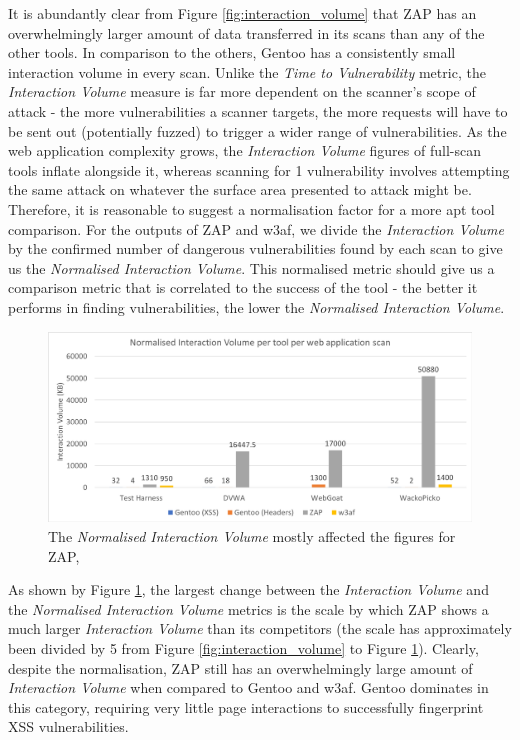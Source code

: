 It is abundantly clear from Figure \ref{fig:interaction_volume} that ZAP has an overwhelmingly larger amount of data transferred in its scans than any of the other tools. In comparison to the others, Gentoo has a consistently small interaction volume in every scan. Unlike the \textit{Time to Vulnerability} metric, the \textit{Interaction Volume} measure is far more dependent on the scanner's scope of attack - the more vulnerabilities a scanner targets, the more requests will have to be sent out (potentially fuzzed) to trigger a wider range of vulnerabilities. As the web application complexity grows, the \textit{Interaction Volume} figures of full-scan tools inflate alongside it, whereas scanning for 1 vulnerability involves attempting the same attack on whatever the surface area presented to attack might be. Therefore, it is reasonable to suggest a normalisation factor for a more apt tool comparison. For the outputs of ZAP and w3af, we divide the \textit{Interaction Volume} by the confirmed number of dangerous vulnerabilities found by each scan to give us the \textit{Normalised Interaction Volume}. This normalised metric should give us a comparison metric that is correlated to the success of the tool - the better it performs in finding vulnerabilities, the lower the \textit{Normalised Interaction Volume}.\\

\begin{figure}[h]
	\centering
	\includegraphics[width=\textwidth]{images/evaluation/normalised_interaction_volume.png}
	\caption{The \textit{Normalised Interaction Volume} mostly affected the figures for ZAP, }
	\label{fig:normalised_interaction_volume}
\end{figure}

As shown by Figure \ref{fig:normalised_interaction_volume}, the largest change between the \textit{Interaction Volume} and the \textit{Normalised Interaction Volume} metrics is the scale by which ZAP shows a much larger \textit{Interaction Volume} than its competitors (the scale has approximately been divided by 5 from Figure \ref{fig:interaction_volume} to Figure \ref{fig:normalised_interaction_volume}). Clearly, despite the normalisation, ZAP still has an overwhelmingly large amount of \textit{Interaction Volume} when compared to Gentoo and w3af. Gentoo dominates in this category, requiring very little page interactions to successfully fingerprint XSS vulnerabilities. \\


